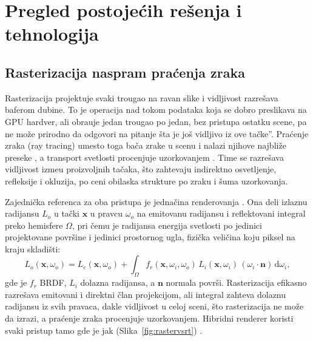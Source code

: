 \chapter{Pregled postoje\'cih re\v{s}enja i tehnologija}
\label{ch:pregled}


\section{Rasterizacija naspram pra\'cenja zraka}
\label{sec:rastervsrt}

Rasterizacija projektuje svaki trougao na ravan slike i vidljivost razre\v{s}ava baferom dubine. To je
operacija nad tokom podataka koja se dobro preslikava na GPU hardver, ali obra\dj uje jedan trougao po
jedan, bez pristupa ostatku scene, pa ne mo\v{z}e prirodno da odgovori na pitanje \quotedblbase{}\v{s}ta je
jo\v{s} vidljivo iz ove ta\v{c}ke\textquotedblright{}. Pra\'cenje zraka (ray tracing) umesto toga ba\v{c}a zrake u scenu i
nalazi njihove najbli\v{z}e preseke \cite{moller1997raytri}, a transport svetlosti procenjuje uzorkovanjem
\cite{pharr2016pbrt}. Time se razre\v{s}ava vidljivost izme\dj u proizvoljnih ta\v{c}aka, \v{s}to zahtevaju
indirektno osvetljenje, refleksije i okluzija, po ceni obilaska strukture po zraku i \v{s}uma uzorkovanja.

Zajedni\v{c}ka referenca za oba pristupa je jedna\v{c}ina renderovanja \cite{kajiya1986rendering}. Ona deli
izlaznu radijansu $L_o$ u ta\v{c}ki $\mathbf{x}$ u pravcu $\omega_o$ na emitovanu radijansu i reflektovani
integral preko hemisfere $\Omega$, pri \v{c}emu je radijansa energija svetlosti po jedinici projektovane
povr\v{s}ine i jedinici prostornog ugla, fizi\v{c}ka veli\v{c}ina koju piksel na kraju skladi\v{s}ti:
\begin{equation}
L_o(\mathbf{x}, \omega_o) = L_e(\mathbf{x}, \omega_o) + \int_{\Omega}
f_r(\mathbf{x}, \omega_i, \omega_o)\, L_i(\mathbf{x}, \omega_i)\, (\omega_i \cdot \mathbf{n})\,
\mathrm{d}\omega_i,
\label{eq:rendering}
\end{equation}
gde je $f_r$ BRDF, $L_i$ dolazna radijansa, a $\mathbf{n}$ normala povr\v{s}i.
Rasterizacija efikasno razre\v{s}ava emitovani i direktni \v{c}lan projekcijom, ali integral zahteva
dolaznu radijansu iz svih pravaca, dakle vidljivost u celoj sceni, \v{s}to rasterizacija ne mo\v{z}e da
izrazi, a pra\'cenje zraka procenjuje uzorkovanjem. Hibridni renderer koristi svaki pristup tamo gde je
jak (Slika~\ref{fig:rastervsrt}) \cite{akenine2018rtr}.

